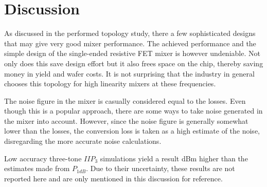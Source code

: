 	\section{Discussion}
		As discussed in the performed topology study, there a few sophisticated designs that may give very good mixer performance. The achieved performance and the simple design of the single-ended resistive FET mixer is however undeniable. Not only does this save design effort but it also frees space on the chip, thereby saving money in yield and wafer costs. It is not surprising that the industry in general chooses this topology for high linearity mixers at these frequencies.\autocite{web:hittite}

		The noise figure in the mixer is casually considered equal to the losses. Even though this is a popular approach, there are some ways to take noise generated in the mixer into account.\autocite{kundert07} However, since the noise figure is generally somewhat lower than the losses, the conversion loss is taken as a high estimate of the noise, disregarding the more accurate noise calculations.

		Low accuracy three-tone $IIP_3$ simulations yield a result \unit[2--3]{dBm} higher than the estimates made from $P_{1dB}$. Due to their uncertainty, these results are not reported here and are only mentioned in this discussion for reference.
